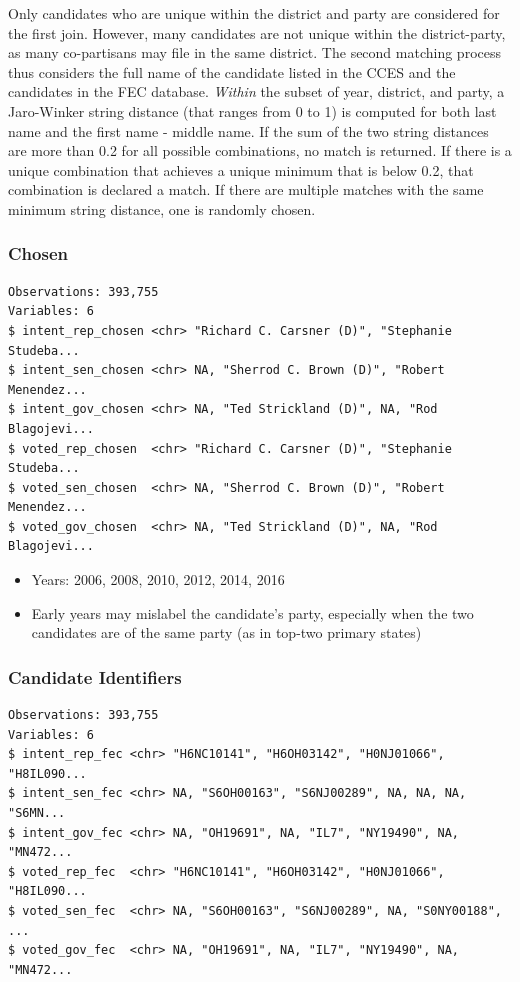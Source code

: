 \documentclass[10pt,article,oneside]{memoir}
\theoremstyle{definition}
\begin{document}
Only candidates who are unique within the district and party are
considered for the first join. However, many candidates are not unique
within the district-party, as many co-partisans may file in the same
district. The second matching process thus considers the full name of
the candidate listed in the CCES and the candidates in the FEC database.
\emph{Within} the subset of year, district, and party, a Jaro-Winker
string distance (that ranges from 0 to 1) is computed for both last name
and the first name - middle name. If the sum of the two string distances
are more than 0.2 for all possible combinations, no match is returned.
If there is a unique combination that achieves a unique minimum that is
below 0.2, that combination is declared a match. If there are multiple
matches with the same minimum string distance, one is randomly chosen.

\hypertarget{chosen}{%
\subsubsection{Chosen}\label{chosen}}

\begin{verbatim}
Observations: 393,755
Variables: 6
$ intent_rep_chosen <chr> "Richard C. Carsner (D)", "Stephanie Studeba...
$ intent_sen_chosen <chr> NA, "Sherrod C. Brown (D)", "Robert Menendez...
$ intent_gov_chosen <chr> NA, "Ted Strickland (D)", NA, "Rod Blagojevi...
$ voted_rep_chosen  <chr> "Richard C. Carsner (D)", "Stephanie Studeba...
$ voted_sen_chosen  <chr> NA, "Sherrod C. Brown (D)", "Robert Menendez...
$ voted_gov_chosen  <chr> NA, "Ted Strickland (D)", NA, "Rod Blagojevi...
\end{verbatim}

\begin{itemize}
\tightlist
\item
  Years: 2006, 2008, 2010, 2012, 2014, 2016
\item
  Early years may mislabel the candidate's party, especially when the
  two candidates are of the same party (as in top-two primary states)
\end{itemize}

\hypertarget{candidate-identifiers}{%
\subsubsection{Candidate Identifiers}\label{candidate-identifiers}}

\begin{verbatim}
Observations: 393,755
Variables: 6
$ intent_rep_fec <chr> "H6NC10141", "H6OH03142", "H0NJ01066", "H8IL090...
$ intent_sen_fec <chr> NA, "S6OH00163", "S6NJ00289", NA, NA, NA, "S6MN...
$ intent_gov_fec <chr> NA, "OH19691", NA, "IL7", "NY19490", NA, "MN472...
$ voted_rep_fec  <chr> "H6NC10141", "H6OH03142", "H0NJ01066", "H8IL090...
$ voted_sen_fec  <chr> NA, "S6OH00163", "S6NJ00289", NA, "S0NY00188", ...
$ voted_gov_fec  <chr> NA, "OH19691", NA, "IL7", "NY19490", NA, "MN472...
\end{verbatim}
\end{document}
